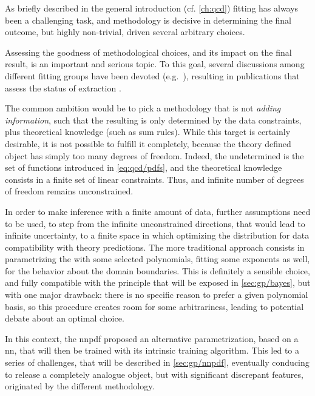 
As briefly described in the general introduction (cf. \cref{ch:qcd}) \pdf
fitting has always been a challenging task, and methodology is decisive in
determining the final outcome, but highly non-trivial, driven several arbitrary
choices.

Assessing the goodness of methodological choices, and its impact on the final
result, is an important and serious topic.
To this goal, several discussions among different \pdf fitting groups have been
devoted (e.g.\ \cite{DeRoeck:2009zz}), resulting in publications that assess the
status of \pdf extraction
\cite{Alekhin:2011sk,Botje:2011sn,Rojo:2016ymp,PDF4LHCWorkingGroup:2022cjn}.

The common ambition would be to pick a methodology that is not \textit{adding
information}, such that the resulting \pdf is only determined by the data
constraints, plus theoretical knowledge (such as sum rules).
%
While this target is certainly desirable, it is not possible to fulfill it
completely, because the theory defined object has simply too many degrees of
freedom.
%
Indeed, the undetermined \pdf is the set of functions introduced in
\cref{eq:qcd/pdfs}, and the theoretical knowledge consists in a finite set of
linear constraints.
Thus, and infinite number of degrees of freedom remains unconstrained.

In order to make inference with a finite amount of data, further assumptions
need to be used, to step from the infinite unconstrained directions, that would
lead to infinite uncertainty, to a finite space in which optimizing the \pdfs
distribution for data compatibility with theory predictions.
%
The more traditional approach consists in parametrizing the \pdfs with some
selected polynomials, fitting some exponents as well, for the behavior about
the domain boundaries.
%
This is definitely a sensible choice, and fully compatible with the principle
that will be exposed in \cref{sec:gp/bayes}, but with one major drawback: there
is no specific reason to prefer a given polynomial basis, so this procedure
creates room for some arbitrariness, leading to potential debate about an
optimal choice.

In this context, the \acrlong{nnpdf} proposed an alternative \pdf
parametrization, based on a \acrfull{nn}, that will then be trained with its
intrinsic training algorithm.
%
This led to a series of challenges, that will be described in
\cref{sec:gp/nnpdf}, eventually conducing to release a completely analogue
object, but with significant discrepant features, originated by the different
methodology.

